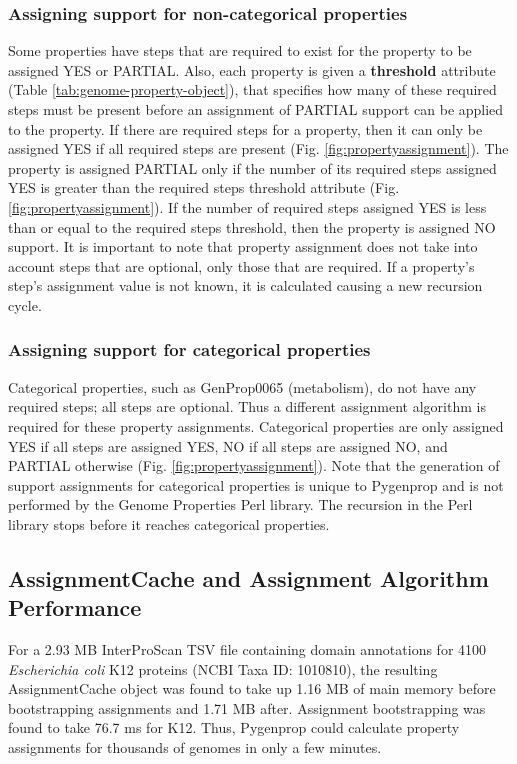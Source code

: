 \subsubsection{Assigning support for non-categorical properties}

Some properties have steps that are required to exist for the property to be assigned YES or PARTIAL. Also, each property is given a \textbf{threshold} attribute (Table \ref{tab:genome-property-object}), that specifies how many of these required steps must be present before an assignment of PARTIAL support can be applied to the property. If there are required steps for a property, then it can only be assigned YES if all required steps are present (Fig. \ref{fig:propertyassignment}). The property is assigned PARTIAL only if the number of its required steps assigned YES is greater than the required steps threshold attribute (Fig. \ref{fig:propertyassignment}). If the number of required steps assigned YES is less than or equal to the required steps threshold, then the property is assigned NO support. It is important to note that property assignment does not take into account steps that are optional, only those that are required. If a property's step's assignment value is not known, it is calculated causing a new recursion cycle.

\subsubsection{Assigning support for categorical properties}

Categorical properties, such as GenProp0065 (metabolism), do not have any required steps; all steps are optional. Thus a different assignment algorithm is required for these property assignments. Categorical properties are only assigned YES if all steps are assigned YES, NO if all steps are assigned NO, and PARTIAL otherwise (Fig. \ref{fig:propertyassignment}). Note that the generation of support assignments for categorical properties is unique to Pygenprop and is not performed by the Genome Properties Perl library. The recursion in the Perl library stops before it reaches categorical properties.

\subsection{AssignmentCache and Assignment Algorithm Performance} \label{AssignmentCache-Performance}

For a 2.93 MB InterProScan TSV file containing domain annotations for 4100 \textit{Escherichia coli} K12 proteins (NCBI Taxa ID: 1010810), the resulting AssignmentCache object was found to take up 1.16 MB of main memory before bootstrapping assignments and 1.71 MB after. Assignment bootstrapping was found to take 76.7  ms for K12. Thus, Pygenprop could calculate property assignments for thousands of genomes in only a few minutes.

